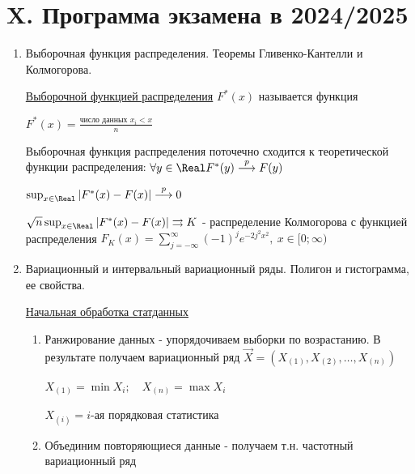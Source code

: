 \clearpage

\section{X. Программа экзамена в 2024/2025}


\begin{enumerate}
    \item Выборочная функция распределения. Теоремы Гливенко-Кантелли и Колмогорова.

    \Def \hyperlink{selective_distribution_function}{Выборочной функцией распределения} $F^*(x)$ называется функция 
    
    $F^*(x) = \frac{\text{число данных } x_i < x}{n}$

    \begin{MyTheorem}
        \Ths Выборочная функция распределения поточечно сходится к теоретической функции распределения: 
        $\forall y \in \Real F^*(y) \overset{p}{\longrightarrow} F(y)$
    \end{MyTheorem}

    \begin{MyTheorem}
         $\sup_{x \in \Real} |F^*(x) - F(x)| \overset{p}{\longrightarrow} 0$
    \end{MyTheorem}

    \begin{MyTheorem}
         $\sqrt{n} \sup_{x \in \Real} |F^*(x) - F(x)| \rightrightarrows K$ - распределение Колмогорова с 
        функцией распределения $F_K(x) = \sum_{j = -\infty}^{\infty} (-1)^j e^{-2 j^2 x^2}, \ x \in [0;\infty)$
    \end{MyTheorem}

    \item Вариационный и интервальный вариационный ряды. Полигон и гистограмма, ее свойства.

        
    \hyperlink{initial_data_processing}{Начальная обработка статданных}

    \begin{enumerate}
        \item Ранжирование данных - упорядочиваем выборки по возрастанию. В результате получаем вариационный ряд $\vec{X} = (X_{(1)}, X_{(2)}, \dots, X_{(n)})$

        $X_{(1)} = \min X_i; \quad X_{(n)} = \max X_i$

        $X_{(i)} = i$-ая порядковая статистика

        \item Объединим повторяющиеся данные - получаем т.н. частотный вариационный ряд


\end{enumerate}
\end{enumerate}
